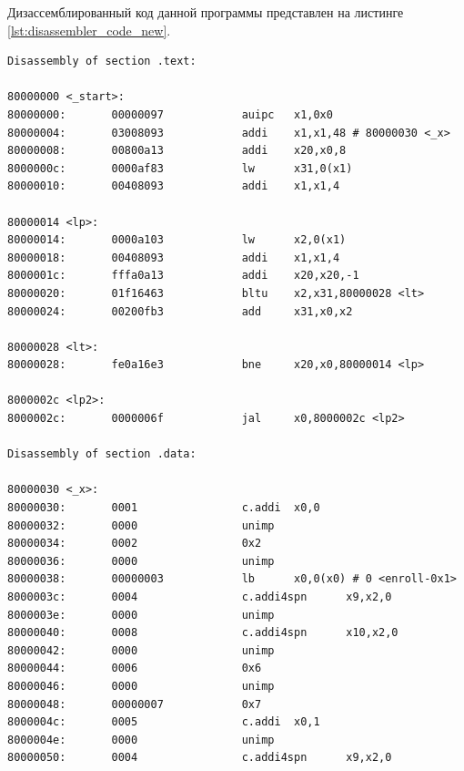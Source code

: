 Дизассемблированный код данной программы представлен на листинге \ref{lst:disassembler_code_new}.
\begin{lstlisting}[label=lst:disassembler_code_new, caption=Дизассемблированный код]
Disassembly of section .text:

80000000 <_start>:
80000000:       00000097            auipc   x1,0x0
80000004:       03008093            addi    x1,x1,48 # 80000030 <_x>
80000008:       00800a13            addi    x20,x0,8
8000000c:       0000af83            lw      x31,0(x1)
80000010:       00408093            addi    x1,x1,4

80000014 <lp>:
80000014:       0000a103            lw      x2,0(x1)
80000018:       00408093            addi    x1,x1,4
8000001c:       fffa0a13            addi    x20,x20,-1
80000020:       01f16463            bltu    x2,x31,80000028 <lt>
80000024:       00200fb3            add     x31,x0,x2

80000028 <lt>:
80000028:       fe0a16e3            bne     x20,x0,80000014 <lp>

8000002c <lp2>:
8000002c:       0000006f            jal     x0,8000002c <lp2>

Disassembly of section .data:

80000030 <_x>:
80000030:       0001                c.addi  x0,0
80000032:       0000                unimp
80000034:       0002                0x2
80000036:       0000                unimp
80000038:       00000003            lb      x0,0(x0) # 0 <enroll-0x1>
8000003c:       0004                c.addi4spn      x9,x2,0
8000003e:       0000                unimp
80000040:       0008                c.addi4spn      x10,x2,0
80000042:       0000                unimp
80000044:       0006                0x6
80000046:       0000                unimp
80000048:       00000007            0x7
8000004c:       0005                c.addi  x0,1
8000004e:       0000                unimp
80000050:       0004                c.addi4spn      x9,x2,0
\end{lstlisting}

